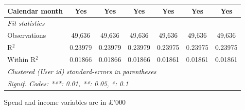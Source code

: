 \begin{table}[htbp]
\begin{threeparttable}[b]
\begin{tabular}{lcccccc}
         Calendar month            & Yes           & Yes           & Yes           & Yes           & Yes           & Yes\\  
         \midrule
         \emph{Fit statistics}\\
         Observations              & 49,636        & 49,636        & 49,636        & 49,636        & 49,636        & 49,636\\  
         R$^2$                     & 0.23979       & 0.23979       & 0.23979       & 0.23975       & 0.23975       & 0.23975\\  
         Within R$^2$              & 0.01866       & 0.01866       & 0.01866       & 0.01861       & 0.01861       & 0.01861\\  
         \midrule \midrule
         \multicolumn{7}{l}{\emph{Clustered (User id) standard-errors in parentheses}}\\
         \multicolumn{7}{l}{\emph{Signif. Codes: ***: 0.01, **: 0.05, *: 0.1}}\\
      \end{tabular}
      
      \begin{tablenotes}\footnotesize
         \item Spend and income variables are in £'000
      \end{tablenotes}
   \end{threeparttable}
\end{table}


